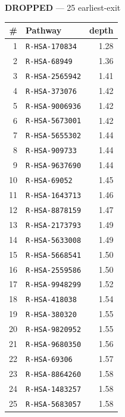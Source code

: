 \documentclass[10pt]{article}
\begin{document}
\begin{minipage}[t]{0.48\textwidth}\centering\textbf{\color{red!60!black}DROPPED} --- 25 earliest-exit\\[3pt]
\begin{tabular}{@{}r l r@{}}
\toprule
\# & Pathway & depth \\
\midrule
1 & \texttt{R-HSA-170834} & 1.28 \\
2 & \texttt{R-HSA-68949} & 1.36 \\
3 & \texttt{R-HSA-2565942} & 1.41 \\
4 & \texttt{R-HSA-373076} & 1.42 \\
5 & \texttt{R-HSA-9006936} & 1.42 \\
6 & \texttt{R-HSA-5673001} & 1.42 \\
7 & \texttt{R-HSA-5655302} & 1.44 \\
8 & \texttt{R-HSA-909733} & 1.44 \\
9 & \texttt{R-HSA-9637690} & 1.44 \\
10 & \texttt{R-HSA-69052} & 1.45 \\
11 & \texttt{R-HSA-1643713} & 1.46 \\
12 & \texttt{R-HSA-8878159} & 1.47 \\
13 & \texttt{R-HSA-2173793} & 1.49 \\
14 & \texttt{R-HSA-5633008} & 1.49 \\
15 & \texttt{R-HSA-5668541} & 1.50 \\
16 & \texttt{R-HSA-2559586} & 1.50 \\
17 & \texttt{R-HSA-9948299} & 1.52 \\
18 & \texttt{R-HSA-418038} & 1.54 \\
19 & \texttt{R-HSA-380320} & 1.55 \\
20 & \texttt{R-HSA-9820952} & 1.55 \\
21 & \texttt{R-HSA-9680350} & 1.56 \\
22 & \texttt{R-HSA-69306} & 1.57 \\
23 & \texttt{R-HSA-8864260} & 1.58 \\
24 & \texttt{R-HSA-1483257} & 1.58 \\
25 & \texttt{R-HSA-5683057} & 1.58 \\
\bottomrule
\end{tabular}
\end{minipage}
\end{document}

